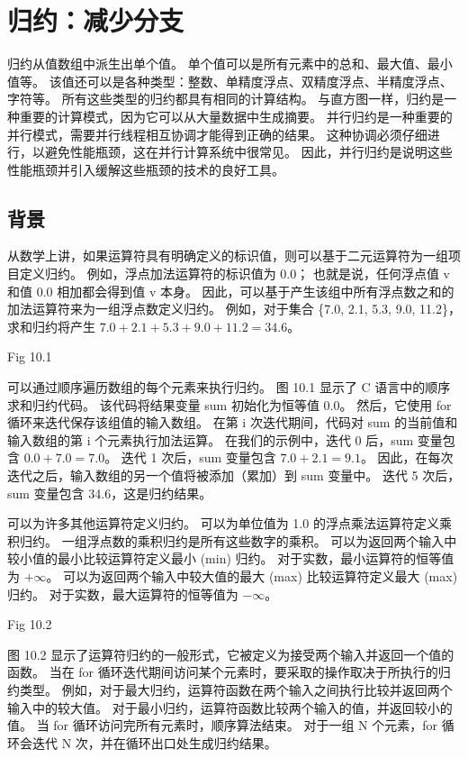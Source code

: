 \section{归约：减少分支}
归约从值数组中派生出单个值。 单个值可以是所有元素中的总和、最大值、最小值等。 
该值还可以是各种类型：整数、单精度浮点、双精度浮点、半精度浮点、字符等。 所有这些类型的归约都具有相同的计算结构。 
与直方图一样，归约是一种重要的计算模式，因为它可以从大量数据中生成摘要。 
并行归约是一种重要的并行模式，需要并行线程相互协调才能得到正确的结果。 
这种协调必须仔细进行，以避免性能瓶颈，这在并行计算系统中很常见。 
因此，并行归约是说明这些性能瓶颈并引入缓解这些瓶颈的技术的良好工具。

\subsection{背景}
从数学上讲，如果运算符具有明确定义的标识值，则可以基于二元运算符为一组项目定义归约。 
例如，浮点加法运算符的标识值为 0.0； 也就是说，任何浮点值 v 和值 0.0 相加都会得到值 v 本身。 
因此，可以基于产生该组中所有浮点数之和的加法运算符来为一组浮点数定义归约。 
例如，对于集合 \{7.0, 2.1, 5.3, 9.0, 11.2\}，求和归约将产生 $7.0+2.1 +5.3+9.0+11.2 = 34.6$。

{\color{red} Fig 10.1}

可以通过顺序遍历数组的每个元素来执行归约。 图 10.1 显示了 C 语言中的顺序求和归约代码。
该代码将结果变量 sum 初始化为恒等值 0.0。 然后，它使用 for 循环来迭代保存该组值的输入数组。 
在第 i 次迭代期间，代码对 sum 的当前值和输入数组的第 i 个元素执行加法运算。 
在我们的示例中，迭代 0 后，sum 变量包含 $0.0+7.0 = 7.0$。 迭代 1 次后，sum 变量包含 $7.0+2.1 = 9.1$。 
因此，在每次迭代之后，输入数组的另一个值将被添加（累加）到 sum 变量中。 迭代 5 次后，sum 变量包含 34.6，这是归约结果。

可以为许多其他运算符定义归约。 可以为单位值为 1.0 的浮点乘法运算符定义乘积归约。 
一组浮点数的乘积归约是所有这些数字的乘积。 可以为返回两个输入中较小值的最小比较运算符定义最小 (min) 归约。 
对于实数，最小运算符的恒等值为 $+\infty$。 可以为返回两个输入中较大值的最大 (max) 比较运算符定义最大 (max) 归约。 
对于实数，最大运算符的恒等值为 $-\infty$。

{\color{red} Fig 10.2}

图 10.2 显示了运算符归约的一般形式，它被定义为接受两个输入并返回一个值的函数。 
当在 for 循环迭代期间访问某个元素时，要采取的操作取决于所执行的归约类型。 
例如，对于最大归约，运算符函数在两个输入之间执行比较并返回两个输入中的较大值。 
对于最小归约，运算符函数比较两个输入的值，并返回较小的值。 当 for 循环访问完所有元素时，顺序算法结束。 
对于一组 N 个元素，for 循环会迭代 N 次，并在循环出口处生成归约结果。

